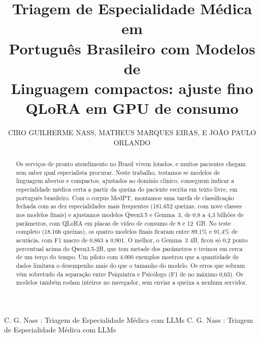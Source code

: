 \documentclass{ieeeaccess}
\begin{document}

\title{Triagem de Especialidade M\'edica em\\ Portugu\^es Brasileiro com Modelos de\\ Linguagem compactos: ajuste fino\\ QLoRA em GPU de consumo}
\author{\uppercase{Ciro Guilherme Nass},
\uppercase{Matheus Marques Eiras}, E
JO\~AO PAULO ORLANDO}

\address[1]{Instituto Federal do Paran\'a (IFPR), Campus Pinhais, Pinhais, PR, Brasil}

\markboth
{C. G. Nass \headeretal: Triagem de Especialidade M\'edica com LLMs}
{C. G. Nass \headeretal: Triagem de Especialidade M\'edica com LLMs}



\begin{abstract}
Os servi\c{c}os de pronto atendimento no Brasil vivem lotados, e muitos pacientes chegam sem saber qual especialista procurar. Neste trabalho, testamos se modelos de linguagem abertos e compactos, ajustados ao dom\'inio cl\'inico, conseguem indicar a especialidade m\'edica certa a partir da queixa do paciente escrita em texto livre, em portugu\^es brasileiro. Com o corpus MedPT, montamos uma tarefa de classifica\c{c}\~ao fechada com as dez especialidades mais frequentes (181.652 queixas, com nove classes nos modelos finais) e ajustamos modelos Qwen3.5 e Gemma~3, de 0,8 a 4,3 bilh\~oes de par\^ametros, com QLoRA em placas de v\'ideo de consumo de 8 e 12~GB. No teste completo (18.166 queixas), os quatro modelos finais ficaram entre 89,1\% e 91,4\% de acur\'acia, com F1 macro de 0,863 a 0,901. O melhor, o Gemma~3 4B, ficou s\'o 0,2 ponto percentual acima do Qwen3.5-2B, que tem metade dos par\^ametros e treinou em cerca de um ter\c{c}o do tempo. Um piloto com 4.000 exemplos mostrou que a quantidade de dados limitava o desempenho mais do que o tamanho do modelo. Os erros que sobram v\^em sobretudo da separa\c{c}\~ao entre Psiquiatra e Psic\'ologo (F1 de no m\'aximo 0,63). Os modelos tamb\'em rodam inteiros no navegador, sem enviar a queixa a nenhum servidor.
\end{abstract}
\end{document}
